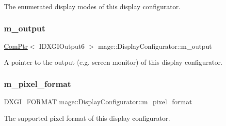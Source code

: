 The enumerated display modes of this display configurator. \hypertarget{classmage_1_1_display_configurator_a255fdce7019b54a3a96021248acad680}{}\label{classmage_1_1_display_configurator_a255fdce7019b54a3a96021248acad680} 
\subsubsection{\texorpdfstring{m\+\_\+output}{m\_output}}
{\footnotesize\ttfamily \hyperlink{namespacemage_ae74f374780900893caa5555d1031fd79}{Com\+Ptr}$<$ I\+D\+X\+G\+I\+Output6 $>$ mage\+::\+Display\+Configurator\+::m\+\_\+output\hspace{0.3cm}{\ttfamily [private]}}

A pointer to the output (e.\+g. screen monitor) of this display configurator. \hypertarget{classmage_1_1_display_configurator_a22998ef4e54c3da0118a734164792b8f}{}\label{classmage_1_1_display_configurator_a22998ef4e54c3da0118a734164792b8f} 
\subsubsection{\texorpdfstring{m\+\_\+pixel\+\_\+format}{m\_pixel\_format}}
{\footnotesize\ttfamily D\+X\+G\+I\+\_\+\+F\+O\+R\+M\+AT mage\+::\+Display\+Configurator\+::m\+\_\+pixel\+\_\+format\hspace{0.3cm}{\ttfamily [private]}}

The supported pixel format of this display configurator. 